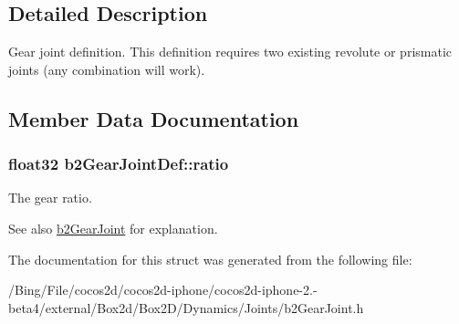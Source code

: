 \subsection{Detailed Description}
Gear joint definition. This definition requires two existing revolute or prismatic joints (any combination will work). 

\subsection{Member Data Documentation}
\hypertarget{structb2_gear_joint_def_a57e9f4b6ce1ddc8b89b8455515f69323}{
\subsubsection[{ratio}]{\setlength{\rightskip}{0pt plus 5cm}float32 {\bf b2\-Gear\-Joint\-Def\-::ratio}}}\label{structb2_gear_joint_def_a57e9f4b6ce1ddc8b89b8455515f69323}
The gear ratio. \begin{DoxySeeAlso}{See also}
\hyperlink{classb2_gear_joint}{b2\-Gear\-Joint} for explanation. 
\end{DoxySeeAlso}


The documentation for this struct was generated from the following file\-:\begin{DoxyCompactItemize}
\item 
/\-Bing/\-File/cocos2d/cocos2d-\/iphone/cocos2d-\/iphone-\/2.-\/beta4/external/\-Box2d/\-Box2\-D/\-Dynamics/\-Joints/b2\-Gear\-Joint.\-h\end{DoxyCompactItemize}
